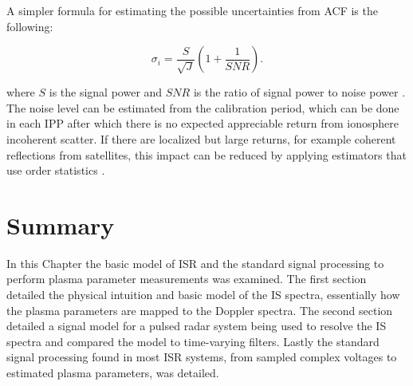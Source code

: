 A simpler formula for estimating the possible uncertainties from ACF is the following:

\begin{equation}
\label{sigpow}
\sigma_i = \frac{S}{\sqrt{J}}\left(1+\frac{1}{SNR}\right).
\end{equation}

\noindent where $S$ is the signal power and $SNR$ is the ratio of signal power to noise power \citep{nicollsisrschool2013}. The noise level can be estimated from the calibration period, which can be done in each IPP after which there is no expected appreciable return from ionosphere incoherent scatter. If there are localized but large returns, for example coherent reflections from satellites, this impact can be reduced by applying estimators that use order statistics \citep{ordstatcfar}.

\section{Summary}
In this Chapter the basic model of ISR and the standard signal processing to perform plasma parameter measurements was examined. The first section detailed the physical intuition and basic model of the IS spectra, essentially how the plasma parameters are mapped to the Doppler spectra. The second section detailed a signal model for a pulsed radar system being used to resolve the IS spectra and compared the model to time-varying filters. Lastly the standard signal processing found in most ISR systems, from sampled complex voltages to estimated plasma parameters, was detailed.
%


